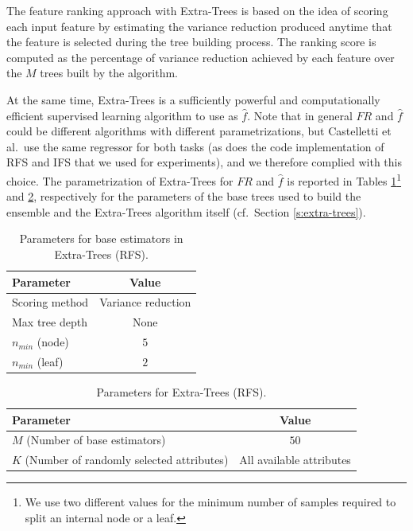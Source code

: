 The feature ranking approach with Extra-Trees is based on the idea of scoring
each input feature by estimating the variance reduction produced anytime that 
the feature is selected during the tree building process. The ranking score is
computed as the percentage of variance reduction achieved by each feature over 
the $M$ trees built by the algorithm.

At the same time, Extra-Trees is a sufficiently powerful and computationally 
efficient supervised learning algorithm to use as $\hat{f}$.
Note that in general $FR$ and $\hat{f}$ could be different algorithms with 
different parametrizations, but Castelletti et al.\ use the same regressor for 
both tasks (as does the code implementation of RFS and IFS that we used for 
experiments), and we therefore complied with this choice.
The parametrization of Extra-Trees for $FR$ and $\hat{f}$ is reported in Tables
\ref{t:RFS_tree_params}\footnote{We use two different values for the minimum 
number of samples required to split an internal node or a leaf.} and 
\ref{t:RFS_extra_params}, respectively for the parameters of the base trees used
to build the ensemble and the Extra-Trees algorithm itself (cf.\ Section 
\ref{s:extra-trees}).
%
\begin{table}	
    \centering
    \begin{tabular}{l c} 
	\hline
	Parameter & Value \\ 
	\hline 
	Scoring method &  Variance reduction \\
	Max tree depth & None \\
	$n_{min}$ (node) & $5$\\
	$n_{min}$ (leaf) & $2$ \\
	\hline
    \end{tabular}
    \caption[Parameters for base estimators in Extra-Trees (RFS)]{Parameters for
	    base estimators in Extra-Trees (RFS).}
    \label{t:RFS_tree_params}
\end{table}
%
%
\begin{table}
    \centering
    \begin{tabular}{l c} 
	\hline
	Parameter & Value \\ 
	\hline 
	$M$ (Number of base estimators) & $50$ \\
	$K$ (Number of randomly selected attributes) &  All available attributes \\
	\hline
    \end{tabular}
    \caption[Parameters for Extra-Trees (RFS)]{Parameters for Extra-Trees (RFS).}
    \label{t:RFS_extra_params}
\end{table}
